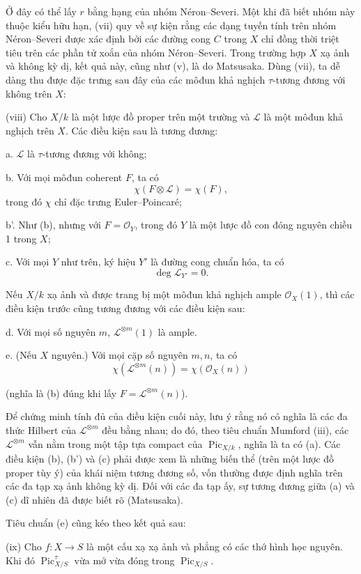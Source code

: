 \documentclass[11pt,twoside,openany]{book}
\numberwithin{equation}{section}
\newcommand{\src}[1]{%
  \phantomsection\hypertarget{src:\fgasourceid:#1}{}%
  \marginpar{\raggedleft\footnotesize\sffamily #1}%
}
\newcommand{\fgasourceid}{unset}
\begin{document}
Ở đây có thể lấy $r$ bằng hạng của nhóm Néron--Severi. Một khi đã biết nhóm
này thuộc kiểu hữu hạn, (vii) quy về sự kiện rằng các dạng tuyến tính trên
nhóm Néron--Severi được xác định bởi các đường cong $C$ trong $X$ chỉ đồng
thời triệt tiêu trên các phần tử xoắn của nhóm Néron--Severi. Trong trường hợp
$X$ xạ ảnh và không kỳ dị, kết quả này, cũng như (v), là do Matsusaka. Dùng
(vii), ta dễ dàng thu được đặc trưng sau đây của các môđun khả nghịch
$\tau$-tương đương với không trên $X$:

\medskip
\noindent(viii) Cho $X/k$ là một lược đồ proper trên một trường và
$\mathcal L$ là một môđun khả nghịch trên $X$. Các điều kiện sau là tương
đương:

\noindent a. $\mathcal L$ là $\tau$-tương đương với không;

\noindent b. Với mọi môđun coherent $F$, ta có
\[
\chi(F\otimes\mathcal L)=\chi(F),
\]
trong đó $\chi$ chỉ đặc trưng Euler--Poincaré;

\noindent b'. Như (b), nhưng với $F=\mathcal O_Y$, trong đó $Y$ là một lược
đồ con đóng nguyên chiều 1 trong $X$;

\noindent c. Với mọi $Y$ như trên, ký hiệu $Y'$ là đường cong chuẩn hóa, ta
có
\[
\deg\mathcal L_{Y'}=0.
\]

Nếu $X/k$ xạ ảnh và được trang bị một môđun khả nghịch ample
$\mathcal O_X(1)$, thì các điều kiện trước cũng tương đương với các điều kiện
sau:

\noindent d. Với mọi số nguyên $m$, $\mathcal L^{\otimes m}(1)$ là ample.

\noindent e. (Nếu $X$ nguyên.) Với mọi cặp số nguyên $m,n$, ta có
\[
\chi(\mathcal L^{\otimes m}(n))=\chi(\mathcal O_X(n))
\]

\src{306}
(nghĩa là (b) đúng khi lấy $F=\mathcal L^{\otimes m}(n)$).

Để chứng minh tính đủ của điều kiện cuối này, lưu ý rằng nó có nghĩa là các
đa thức Hilbert của $\mathcal L^{\otimes m}$ đều bằng nhau; do đó, theo tiêu
chuẩn Mumford (iii), các $\mathcal L^{\otimes m}$ vẫn nằm trong một tập tựa
compact của $\operatorname{Pic}_{X/k}$, nghĩa là ta có (a). Các điều kiện (b),
(b') và (c) phải được xem là những biến thể (trên một lược đồ proper tùy ý)
của khái niệm tương đương số, vốn thường được định nghĩa trên các đa tạp xạ
ảnh không kỳ dị. Đối với các đa tạp ấy, sự tương đương giữa (a) và (c) dĩ
nhiên đã được biết rõ (Matsusaka).

Tiêu chuẩn (e) cũng kéo theo kết quả sau:

\medskip
\noindent(ix) Cho $f:X\longrightarrow S$ là một cấu xạ xạ ảnh và phẳng có
các thớ hình học nguyên. Khi đó $\operatorname{Pic}_{X/S}^\tau$ vừa mở vừa
đóng trong $\operatorname{Pic}_{X/S}$.
\end{document}
